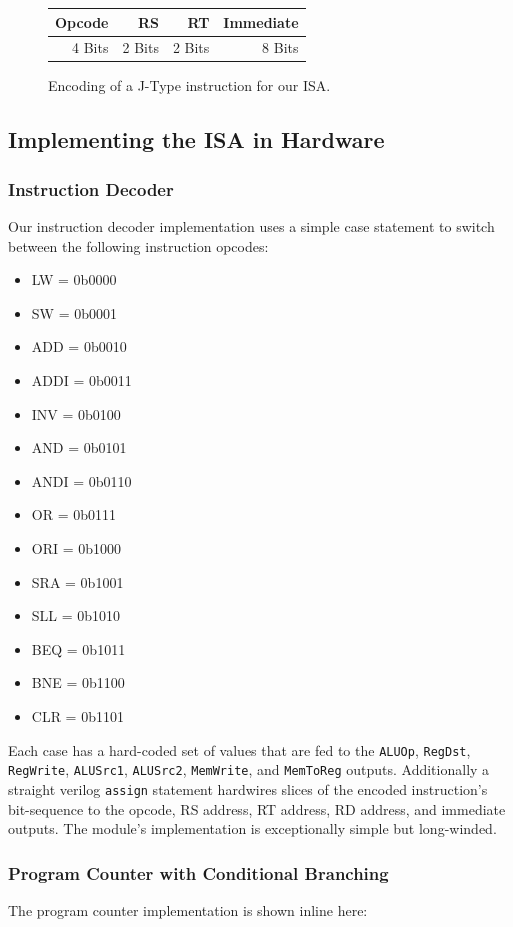 \documentclass[12pt, letterpaper]{article}
\begin{document}
\begin{figure}[h]
\centering
\begin{tabular}{|r|r|r|r|}
\hline
Opcode & RS     & RT     & Immediate \\ 
\hline
4 Bits & 2 Bits & 2 Bits & 8 Bits \\ 
\hline
\end{tabular}
\caption{Encoding of a J-Type instruction for our ISA.}
\end{figure}

\subsection{Implementing the ISA in Hardware}
\subsubsection{Instruction Decoder}
Our instruction decoder implementation uses a simple case statement to switch between the following instruction opcodes:
\begin{itemize}
\item LW   = 0b0000
\item SW   = 0b0001
\item ADD  = 0b0010
\item ADDI = 0b0011
\item INV  = 0b0100
\item AND  = 0b0101
\item ANDI = 0b0110
\item OR   = 0b0111
\item ORI  = 0b1000
\item SRA  = 0b1001
\item SLL  = 0b1010
\item BEQ  = 0b1011
\item BNE  = 0b1100
\item CLR  = 0b1101
\end{itemize}
Each case has a hard-coded set of values that are fed to the \texttt{ALUOp}, \texttt{RegDst}, \texttt{RegWrite}, \texttt{ALUSrc1}, \texttt{ALUSrc2}, \texttt{MemWrite}, and \texttt{MemToReg} outputs.  Additionally a straight verilog \texttt{assign} statement hardwires slices of the encoded instruction's bit-sequence to the opcode, RS address, RT address, RD address, and immediate outputs.  The module's implementation is exceptionally simple but long-winded.

\subsubsection{Program Counter with Conditional Branching}
The program counter implementation is shown inline here:

\end{document}
